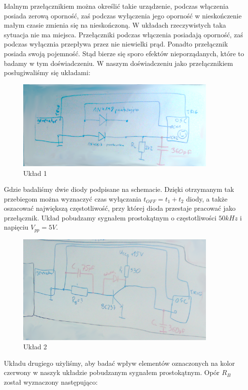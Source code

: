 \documentclass[a4paper,11pt]{article}
\begin{document}
Idalnym przełącznikiem można określić takie urządzenie, podczas włączenia posiada zerową oporność, zaś podczas wyłączenia jego oporność w nieskończenie małym czasie zmienia się na nieskończoną. W układach rzeczywistych taka sytuacja nie ma miejsca. Przełączniki podczas włączenia posiadają oporność, zaś podczas wyłącznia przepływa przez nie niewielki prąd. Ponadto przełącznik posiada swoją pojemność. Stąd bierze się sporo efektów nieporządanych, które to badamy w tym doświadczeniu. W naszym doświadczeniu jako przełącznikiem posługiwaliśmy się układami: 
\begin{figure} [H]
  \begin{center}
    \includegraphics[width = 10cm]{../Obrazki_i_tekst/obrobione/u1.png}
    \caption{Układ 1}
  \end{center}
\end{figure}
Gdzie badaliśmy dwie diody podpisane na schemacie. Dzięki otrzymanym tak przebiegom można wyznaczyć czas wyłączania 
 $ t_{OFF} = t_1 + t_2 $  diody, a także oszacować największą częstotliwość, przy której dioda przestaje pracować jako przełącznik.  Układ pobudzamy sygnałem prostokątnym o częstotliwości $50 kHz$ i napięciu $V_{pp}=	5 V$.



\begin{figure} [H]
  \begin{center}
    \includegraphics[width = 10cm]{../Obrazki_i_tekst/obrobione/u2.png}
    \caption{Układ 2}
  \end{center}
\end{figure}
Układu drugiego użyliśmy, aby badać wpływ elementów oznaczonych na kolor czerwony w naszyk układzie pobudzanym sygnałem prostokątnym. Opór $R_B$ został wyznaczony następująco: 
\end{document}
